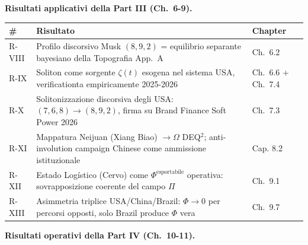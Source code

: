\Proved{} \textbf{Risultati applicativi della Part III (Ch.~6-9).}

{\def\LTcaptype{none} %
{\small\begin{longtable}[]{@{}
  >{\raggedright\arraybackslash}p{}
  >{\raggedright\arraybackslash}p{}
  >{\raggedright\arraybackslash}p{}@{}}
\toprule\noalign{}
\begin{minipage}[b]{\linewidth}\raggedright
\#
\end{minipage} & \begin{minipage}[b]{\linewidth}\raggedright
Risultato
\end{minipage} & \begin{minipage}[b]{\linewidth}\raggedright
Chapter
\end{minipage} \\
\midrule\noalign{}
\endhead
\bottomrule\noalign{}
\endlastfoot
R-VIII & Profilo discorsivo Musk \((8, 9, 2)\) = equilibrio separante
bayesiano della Topografia App.~A & Ch.~6.2 \\
R-IX & Soliton come sorgente \(\zeta(t)\) esogena nel sistema USA,
verificationta empiricamente 2025-2026 & Ch.~6.6 + Ch.~7.4 \\
R-X & Solitonizzazione discorsiva degli USA: \((7,6,8) \to (8,9,2)\),
firma su Brand Finance Soft Power 2026 & Ch.~7.3 \\
R-XI & Mappatura Neijuan (Xiang Biao) \(\to \Omega\) DEQ$^2$;
anti-involution campaign Chinese come ammissione istituzionale & Cap.
8.2 \\
R-XII & Estado Logístico (Cervo) come \(\Phi^{\text{esportabile}}\)
operativa: sovrapposizione coerente del campo \(\Pi\) & Ch.~9.1 \\
R-XIII & Asimmetria triplice USA/China/Brazil: \(\Phi \to 0\) per
percorsi opposti, solo Brazil produce \(\Phi\) vera & Ch.~9.7 \\
\end{longtable}}
}

\Proved{} \textbf{Risultati operativi della Part IV (Ch.~10-11).}

